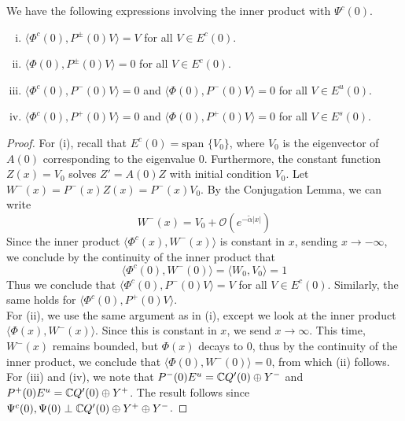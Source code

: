 \documentclass[thesis.tex]{subfiles}
\begin{document}
\begin{lemma}\label{PsiIP}
We have the following expressions involving the inner product with $\Psi^c(0)$.
\begin{enumerate}[(i)]
	\item $\langle \Phi^c(0), P^\pm(0) V \rangle = V$ for all $V \in E^c(0)$.
	\item $\langle \Phi(0), P^\pm(0) V \rangle = 0$ for all $V \in E^c(0)$.
	\item $\langle \Phi^c(0), P^-(0) V \rangle = 0$ and $\langle \Phi(0), P^-(0) V \rangle = 0$ for all $V \in E^u(0)$.
	\item $\langle \Phi^c(0), P^+(0) V \rangle = 0$ and $\langle \Phi(0), P^+(0) V \rangle = 0$ for all $V \in E^s(0)$.
\end{enumerate}
\begin{proof}
For (i), recall that $E^c(0) = \text{span }\{ V_0 \}$, where $V_0$ is the eigenvector of $A(0)$ corresponding to the eigenvalue 0. Furthermore, the constant function $Z(x) = V_0$ solves $Z' = A(0) Z$ with initial condition $V_0$. Let $W^-(x) = P^-(x) Z(x) = P^-(x) V_0$. By the Conjugation Lemma, we can write
\[
W^-(x) = V_0 + \mathcal{O}({e^{-\tilde{\alpha}|x|}})
\]
Since the inner product $\langle \Phi^c(x), W^-(x) \rangle$ is constant in $x$, sending $x \rightarrow -\infty$, we conclude by the continuity of the inner product that
\[
\langle \Phi^c(0), W^-(0) \rangle = \langle W_0, V_0 \rangle = 1 
\]
Thus we conclude that $\langle \Phi^c(0), P^-(0) V \rangle = V$ for all $V \in E^c(0)$. Similarly, the same holds for $\langle \Phi^c(0), P^+(0) V \rangle$.\\

For (ii), we use the same argument as in (i), except we look at the inner product $\langle \Phi(x), W^-(x) \rangle$. Since this is constant in $x$, we send $x \rightarrow \infty$. This time, $W^-(x)$ remains bounded, but $\Phi(x)$ decays to 0, thus by the continuity of the inner product, we conclude that $\langle \Phi(0), W^-(0) \rangle = 0$, from which (ii) follows.\\

For (iii) and (iv), we note that $P^-(0)E^u = {\mathbb C} Q'(0) \oplus Y^-$ and $P^+(0)E^u = {\mathbb C} Q'(0) \oplus Y^+$. The result follows since $\Psi^c(0), \Psi(0) \perp {\mathbb C} Q'(0) \oplus Y^+ \oplus Y^-$.
\end{proof}
\end{lemma}

\end{document}
